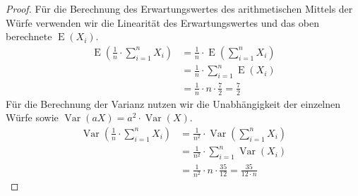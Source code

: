 \documentclass[a4paper]{scrartcl}
\newcommand{\e}{\operatorname{E}}
\newcommand{\var}{\operatorname{Var}}
\begin{document}
\begin{enumerate}[label=\bfseries\arabic*.]
\begin{enumerate}[label=(\alph*)]
\begin{proof}
                    Für die Berechnung des Erwartungswertes des arithmetischen
                    Mittels der Würfe verwenden wir die Linearität des
                    Erwartungswertes und das oben berechnete $\e(X_i)$.
                    \begin{equation*}
                        \begin{split}
                            \e \left( \frac{1}{n} \cdot \sum_{i=1}^n X_i \right)
                            &= \frac{1}{n} \cdot
                                \e \left( \sum_{i=1}^n X_i \right) \\
                            &= \frac{1}{n} \cdot \sum_{i=1}^n \e(X_i) \\
                            &= \frac{1}{n} \cdot n \cdot \frac{7}{2}
                            = \frac{7}{2}
                        \end{split}
                    \end{equation*}
                    Für die Berechnung der Varianz nutzen wir die Unabhängigkeit
                    der einzelnen Würfe sowie $\var(aX) = a^2 \cdot \var(X)$.
                    \begin{equation*}
                        \begin{split}
                            \var \left(\frac{1}{n} \cdot \sum_{i=1}^n X_i\right)
                            &= \frac{1}{n^2} \cdot
                                \var \left(\sum_{i=1}^n X_i\right) \\
                            &= \frac{1}{n^2} \cdot \sum_{i=1}^n \var(X_i) \\
                            &= \frac{1}{n^2} \cdot n \cdot \frac{35}{12}
                            = \frac{35}{12 \cdot n}
                        \end{split}
                    \end{equation*}
                \end{proof}


\end{enumerate}
\end{enumerate}
\end{document}
